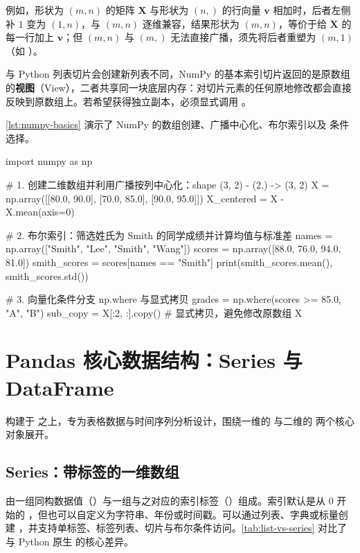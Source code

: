 例如，形状为 $(m, n)$ 的矩阵 $\bm{X}$ 与形状为 $(n,)$ 的行向量 $\bm{v}$ 相加时，后者左侧补 $1$ 变为 $(1, n)$，与 $(m, n)$ 逐维兼容，结果形状为 $(m, n)$，等价于给 $\bm{X}$ 的每一行加上 $\bm{v}$；但 $(m, n)$ 与 $(m,)$ 无法直接广播，须先将后者重塑为 $(m, 1)$（如 ）。

\begin{pitfall}\label{pit:numpy-view}
与 Python 列表切片会创建新列表不同，NumPy 的基本索引切片返回的是原数组的\textbf{视图}（View），二者共享同一块底层内存：对切片元素的任何原地修改都会直接反映到原数组上。若希望获得独立副本，必须显式调用 。
\end{pitfall}

\cref{lst:numpy-basics} 演示了 NumPy 的数组创建、广播中心化、布尔索引以及  条件选择。

\begin{codeblock}[language=Python,caption={NumPy 向量化运算、广播与布尔索引示例},label=lst:numpy-basics]
import numpy as np

# 1. 创建二维数组并利用广播按列中心化：shape (3, 2) - (2,) -> (3, 2)
X = np.array([[80.0, 90.0], [70.0, 85.0], [90.0, 95.0]])
X_centered = X - X.mean(axis=0)

# 2. 布尔索引：筛选姓氏为 Smith 的同学成绩并计算均值与标准差
names = np.array(["Smith", "Lee", "Smith", "Wang"])
scores = np.array([88.0, 76.0, 94.0, 81.0])
smith_scores = scores[names == "Smith"]
print(smith_scores.mean(), smith_scores.std())

# 3. 向量化条件分支 np.where 与显式拷贝
grades = np.where(scores >= 85.0, "A", "B")
sub_copy = X[:2, :].copy()  # 显式拷贝，避免修改原数组 X
\end{codeblock}

\section{Pandas 核心数据结构：Series 与 DataFrame}\label{sec:pandas-structures}

 构建于  之上，专为表格数据与时间序列分析设计，围绕一维的  与二维的  两个核心对象展开。

\subsection{Series：带标签的一维数组}

 由一组同构数据值（）与一组与之对应的索引标签（）组成。索引默认是从 $0$ 开始的 ，但也可以自定义为字符串、年份或时间戳。可以通过列表、字典或标量创建 ，并支持单标签、标签列表、切片与布尔条件访问。\cref{tab:list-vs-series} 对比了  与 Python 原生  的核心差异。

